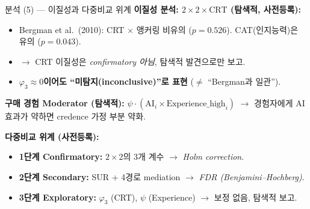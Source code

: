 \documentclass[aspectratio=169]{beamer}
\begin{document}
\begin{frame}{분석 (5) --- 이질성과 다중비교 위계}
  \textbf{이질성 분석: $2 \times 2 \times \mathrm{CRT}$ (탐색적, 사전등록):}
  \begin{itemize}\itemsep0.1em
    \item Bergman et al.\ (2010): CRT $\times$ 앵커링 비유의 ($p = 0.526$). CAT(인지능력)은 유의 ($p = 0.043$).
    \item $\rightarrow$ CRT 이질성은 \emph{confirmatory 아님}, 탐색적 발견으로만 보고.
    \item \textbf{$\varphi_3 \approx 0$이어도 ``미탐지(inconclusive)''로 표현} ($\neq$ ``Bergman과 일관'').
  \end{itemize}

  \vspace{0.3em}
  \textbf{구매 경험 Moderator (탐색적):}
  $\psi \cdot (\mathrm{AI}_i \times \mathrm{Experience\_high}_i)$
  $\rightarrow$ 경험자에게 AI 효과가 약하면 credence 가정 부분 약화.

  \vspace{0.4em}
  \textbf{다중비교 위계 (사전등록):}
  \begin{itemize}\itemsep0.05em
    \item \textbf{1단계 Confirmatory:} $2 \times 2$의 3개 계수 $\rightarrow$ \emph{Holm correction}.
    \item \textbf{2단계 Secondary:} SUR + 4경로 mediation $\rightarrow$ \emph{FDR (Benjamini--Hochberg)}.
    \item \textbf{3단계 Exploratory:} $\varphi_3$ (CRT), $\psi$ (Experience) $\rightarrow$ 보정 없음, 탐색적 보고.
  \end{itemize}

  \vspace{0.2em}
\end{frame}

\end{document}
